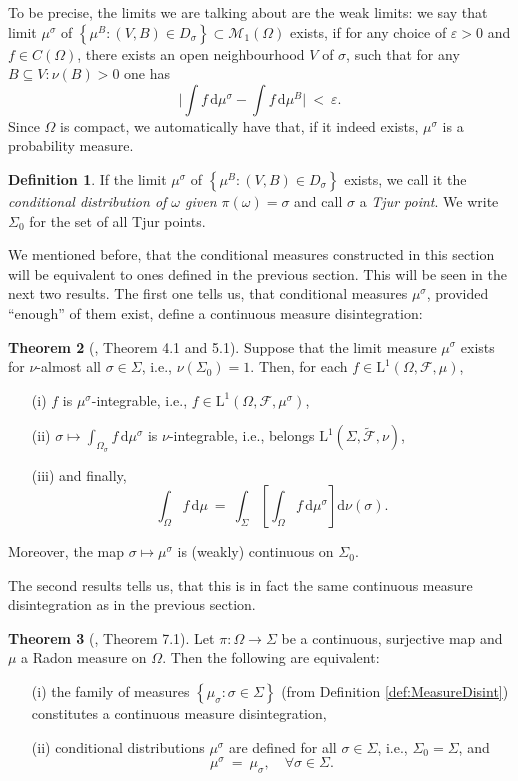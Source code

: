 \documentclass[12pt]{article}
\renewcommand{\d}{\mathrm{d}}
\newcommand{\F}{\mathcal{F}}
\newcommand{\M}{\mathcal{M}}
\newcommand{\set}[1]{\left\{#1\right\}}
\newcommand{\oglati}[1]{\left[#1\right]}
\newcommand{\ra}{\rightarrow}
\newcommand{\1}{\mathbbm{1}}
\newcommand{\5}{\vspace{0.5cm}}
\renewcommand{\tilde}{\widetilde}
\theoremstyle{definition}
\newtheorem{thm}{Theorem}[section]
\newtheorem{df}[thm]{Definition}
\begin{document}
To be precise, the limits we are talking about are the weak limits: we say that limit $\mu^\sigma$ of $\set{\mu^B:(V,B)\in D_\sigma}\subset\M_1(\Omega)$ exists, if for any choice of $\varepsilon>0$ and $f\in C(\Omega)$, there exists an open neighbourhood $V$ of $\sigma$, such that for any $B\subseteq V:\nu(B)>0$ one has
$$\Big|\int f\,\d\mu^\sigma-\int f\,\d\mu^B\Big| ~<~ \varepsilon.$$
Since $\Omega$ is compact, we automatically have that, if it indeed exists, $\mu^\sigma$ is a probability measure.

\begin{df} 
If the limit $\mu^\sigma$ of $\set{\mu^B:(V,B)\in D_\sigma}$ exists, we call it the \textit{conditional distribution of $\omega$ given $\pi(\omega)=\sigma$} and call $\sigma$ a \textit{Tjur point}. We write $\Sigma_0$ for the set of all Tjur points.
\end{df}

We mentioned before, that the conditional measures constructed in this section will be equivalent to ones defined in the previous section. This will be seen in the next two results. The first one tells us, that conditional measures $\mu^\sigma$, provided ``enough'' of them exist, define a continuous measure disintegration:

\begin{thm}[\cite{Tju}, Theorem 4.1 and 5.1]
Suppose that the limit measure $\mu^\sigma$ exists for $\nu$-almost all $\sigma\in\Sigma$, i.e., $\nu(\Sigma_0)=1$. Then, for each $f\in\mathrm{L}^1(\Omega,\F,\mu)$,
\begin{itemize}
	\item[(i)] $f$ is $\mu^\sigma$-integrable, i.e., $f\in\mathrm{L}^1(\Omega,\F,\mu^\sigma)$, 
	\item[(ii)] $\sigma\mapsto\int_{\Omega_\sigma}f\,\d\mu^\sigma$ is $\nu$-integrable, i.e., belongs $\mathrm{L}^1(\Sigma,\tilde{\F},\nu)$, 
	\item[(iii)] and finally,
	$$\int_\Omega f\,\d\mu ~=~ \int_\Sigma\!\oglati{\int_\Omega f\,\d\mu^\sigma}\!\d\nu(\sigma).$$
\end{itemize}
Moreover, the map $\sigma\mapsto\mu^\sigma$ is (weakly) continuous on $\Sigma_0$.
\end{thm}
The second results tells us, that this is in fact the same continuous measure disintegration as in the previous section.
\begin{thm}[\cite{Tju}, Theorem 7.1]
Let $\pi:\Omega\ra\Sigma$ be a continuous, surjective map and $\mu$ a Radon measure on $\Omega$. Then the following are equivalent:
\begin{itemize}
	\item[(i)] the family of measures $\set{\mu_\sigma:\sigma\in\Sigma}$ (from Definition \ref{def:MeasureDisint}) constitutes a continuous measure disintegration,
	\item[(ii)] conditional distributions $\mu^\sigma$ are defined for all $\sigma\in\Sigma$, i.e., $\Sigma_0=\Sigma$, and
	$$\mu^\sigma ~=~ \mu_\sigma, \quad \forall \sigma\in\Sigma.$$
\end{itemize}
\end{thm}
\end{document}
